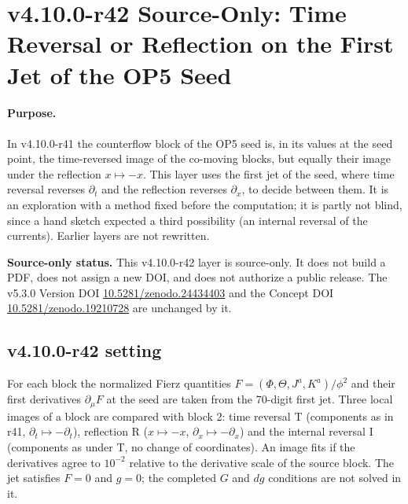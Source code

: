 \clearpage
\section*{v4.10.0-r42 Source-Only: Time Reversal or Reflection on the First Jet of the OP5 Seed}
\label{sec:v4100-r42-counterflow-jet}

\paragraph{Purpose.}
In v4.10.0-r41 the counterflow block of the OP5 seed is, in its values at the seed point, the time-reversed image of the co-moving blocks,
but equally their image under the reflection \(x\mapsto-x\).  This layer uses the first jet of the seed, where time reversal reverses \(\partial_t\) and the
reflection reverses \(\partial_x\), to decide between them.  It is an exploration with a method fixed before the computation; it is partly not blind,
since a hand sketch expected a third possibility (an internal reversal of the currents).  Earlier layers are not rewritten.

\noindent\textbf{Source-only status.}
This v4.10.0-r42 layer is source-only.  It does not build a PDF, does not assign a new DOI,
and does not authorize a public release.  The v5.3.0 Version DOI
\href{https://doi.org/10.5281/zenodo.24434403}{10.5281/zenodo.24434403} and the Concept DOI
\href{https://doi.org/10.5281/zenodo.19210728}{10.5281/zenodo.19210728} are unchanged by it.

\subsection*{v4.10.0-r42 setting}
\label{subsec:v4100-r42-setting}

For each block the normalized Fierz quantities \(F=(\Phi,\Theta,J^a,K^a)/\phi^2\) and their first derivatives \(\partial_\mu F\) at the seed are taken from the
70-digit first jet.  Three local images of a block are compared with block 2: time reversal T (components as in r41, \(\partial_t\mapsto-\partial_t\)),
reflection R (\(x\mapsto-x\), \(\partial_x\mapsto-\partial_x\)) and the internal reversal I (components as under T, no change of coordinates).  An image fits if
the derivatives agree to \(10^{-2}\) relative to the derivative scale of the source block.  The jet satisfies \(F=0\) and \(g=0\); the completed \(G\)
and \(dg\) conditions are not solved in it.

